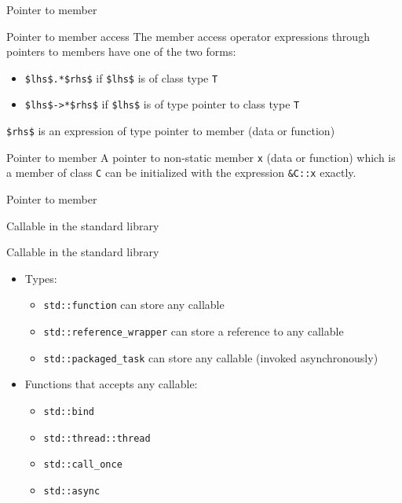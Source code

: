 \begin{frame}{Pointer to member}{}
  \begin{block}{Pointer to member access}
    The member access operator expressions through pointers to members have one of the two forms:
    \begin{itemize}
    \item
      \lstinline[mathescape]!$lhs$.*$rhs$! if \lstinline[mathescape]!$lhs$! is of class type \lstinline!T!
    \item
      \lstinline[mathescape]!$lhs$->*$rhs$! if \lstinline[mathescape]!$lhs$! is of type pointer to class type \lstinline!T!
    \end{itemize}
    \lstinline[mathescape]!$rhs$! is an expression of type pointer to member (data or function)
  \end{block}

  \begin{block}{Pointer to member}
    A pointer to non-static member \lstinline!x! (data or function) which is a member of class \lstinline!C! can be initialized with the expression \lstinline!&C::x! exactly.
  \end{block}
\end{frame}


\begin{frame}{Pointer to member}{}
  \begin{example}
  \end{example}
\end{frame}

\begin{frame}{Callable in the standard library}{}
  \begin{block}{Callable in the standard library}
    \begin{itemize}
    \item
      Types:
      \begin{itemize}
      \item
        \lstinline!std::function! can store any callable
      \item
        \lstinline!std::reference_wrapper! can store a reference to any callable
      \item
        \lstinline!std::packaged_task! can store any callable (invoked asynchronously)
      \end{itemize}
    \item
      Functions that accepts any callable:
      \begin{itemize}
      \item
        \lstinline!std::bind!
      \item
        \lstinline!std::thread::thread!
      \item
        \lstinline!std::call_once!
      \item
        \lstinline!std::async!
      \end{itemize}
    \end{itemize}
  \end{block}
\end{frame}

